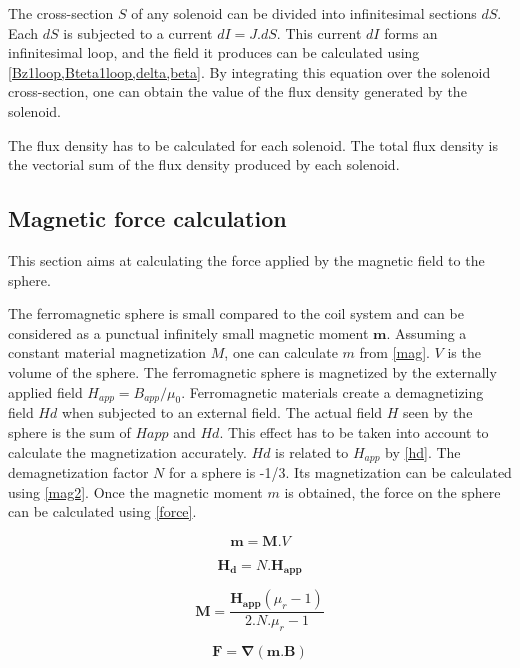 \documentclass[letterpaper, 10 pt, conference]{ieeeconf}  %
\begin{document}
The cross-section $S$ of any solenoid can be divided into infinitesimal sections $dS$. Each $dS$ is subjected to a current $dI=J.dS$. This current $dI$ forms an infinitesimal loop, and the field it produces can be calculated using \cref{Bz1loop,Bteta1loop,delta,beta}. By integrating this equation over the solenoid cross-section, one can obtain the value of the flux density generated by the solenoid.\par
The flux density has to be calculated for each solenoid. The total flux density is the vectorial sum of the flux density produced by each solenoid.

\subsection{Magnetic force calculation}

This section aims at calculating the force applied by the magnetic field to the sphere.\par
The ferromagnetic sphere is small compared to the coil system and can be considered as a punctual infinitely small magnetic moment $\mathbf{m}$. Assuming a constant material magnetization $M$, one can calculate $m$ from \ref{mag}. $V$ is the volume of the sphere.
The ferromagnetic sphere is magnetized by the externally applied field $H_{app}=B_{app}/\mu_0$. Ferromagnetic materials create a demagnetizing field $Hd$ when subjected to an external field. The actual field $H$ seen by the sphere is the sum of $Happ$ and $Hd$. This effect has to be taken into account to calculate the magnetization accurately. $Hd$ is related to $H_{app}$ by \ref{hd}. The demagnetization factor $N$ for a sphere is -1/3. Its magnetization can be calculated using \ref{mag2}.
Once the magnetic moment $m$ is obtained, the force on the sphere can be calculated using \ref{force}.

\begin{equation}
\mathbf{m}=\mathbf{M}.V
\label{mag}
\end{equation}

\begin{equation}
\mathbf{H_d}=N.\mathbf{H_{app}}
\label{hd}
\end{equation}

\begin{equation}
\mathbf{M}=\frac{\mathbf{H_{app}}\left ( \mu_r-1  \right )}{2.N.\mu_r-1}
\label{mag2}
\end{equation}

\begin{equation}
\mathbf{F}=\mathbf{\nabla}(\mathbf{m}.\mathbf{B})
\label{force}
\end{equation}
\end{document}
